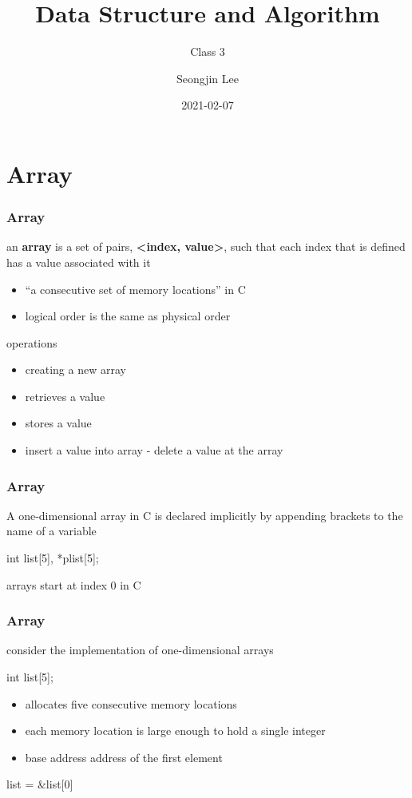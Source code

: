\documentclass[newPxFont,sthlmFooter,nooffset]{beamer}
\title{Data Structure and Algorithm}
\subtitle{Class 3}
\author[SJL]{Seongjin Lee}
\institute{\href{mailto:insight@gnu.ac.kr}{insight@gnu.ac.kr}\\\url{http://resourceful.github.io}\\Systems Research Lab.\\GNU}
\date{2021-02-07}
\begin{document}
\frame[plain,t]{\titlepage} 



\section{Array} 
\begin{frame}[t]
  \frametitle{Array}
an \textbf{array} is a set of pairs, \textbf{<index, value>}, such that each index that is defined has a value associated with it
\begin{itemize}
\item  ``a consecutive set of memory locations'' in C
\item  logical order is the same as physical order
\end{itemize}

operations
\begin{itemize}
\item creating a new array
\item retrieves a value
\item stores a value
\item insert a value into array - delete a value at the array
\end{itemize}

\end{frame}

\begin{frame}[t, fragile]
  \frametitle{Array}
A one-dimensional array in C is declared implicitly by appending brackets to the name of a variable

\begin{codedef}
  int list[5], *plist[5];
\end{codedef}

arrays start at index 0 in C  
\end{frame}

\begin{frame}[t, fragile]
  \frametitle{Array}
consider the implementation of one-dimensional arrays

\begin{codedefnb}
int list[5];
\end{codedefnb}

\begin{itemize}
\item allocates five consecutive memory locations
\item each memory location is large enough to hold a single integer
\item base address address of the first element
\end{itemize}

\begin{codedefnb}
list = &list[0]
\end{codedefnb}

\end{frame}
\end{document}
